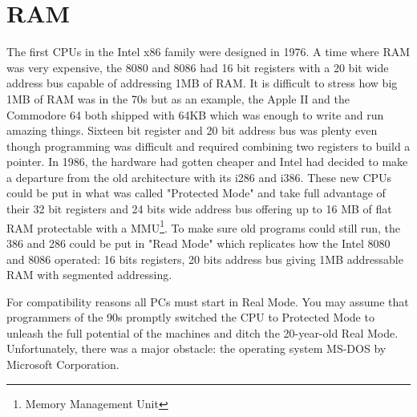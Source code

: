 \documentclass[book.tex]{subfiles}
\begin{document}
\section{RAM}
The first CPUs in the Intel x86 family were designed in 1976. A time where RAM was very expensive, the 8080 and 8086 had 16 bit registers with a 20 bit wide address bus capable of addressing 1MB of RAM. It is difficult to stress how big 1MB of RAM was in the 70s but as an example, the Apple II and the Commodore 64 both shipped with 64KB which was enough to write and run amazing things. Sixteen bit register and 20 bit address bus was plenty even though programming was difficult and required combining two registers to build a pointer. In 1986, the hardware had gotten cheaper and Intel had decided to make a departure from the old architecture with its i286 and i386. These new CPUs could be put in what was called "Protected Mode" and take full advantage of their 32 bit registers and 24 bits wide address bus offering up to 16 MB of flat RAM protectable with a MMU\footnote{Memory Management Unit}. To make sure old programs could still run, the 386 and 286 could be put in "Read Mode" which replicates how the Intel 8080 and 8086 operated: 16 bits registers, 20 bits address bus giving 1MB addressable RAM with segmented addressing.\\
\par
For compatibility reasons all PCs must start in Real Mode. You may assume that programmers of the 90s promptly switched the CPU to Protected Mode to unleash the full potential of the machines and ditch the 20-year-old Real Mode. Unfortunately, there was a major obstacle: the operating system MS-DOS by Microsoft Corporation.
  
\end{document}
